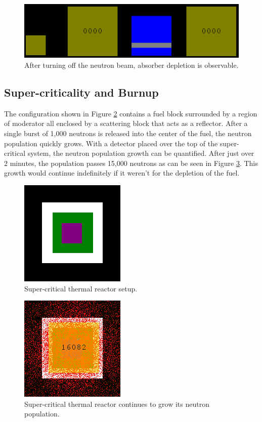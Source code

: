 \documentclass{anstrans}
\begin{document}
\begin{figure}
    \centering
    \includegraphics[width=\columnwidth]{atten-off.png}
    \caption{After turning off the neutron beam, absorber depletion is observable.}
    \label{fig:atten-off}
\end{figure}

\subsection{Super-criticality and Burnup}

The configuration shown in Figure \ref{fig:thermal-setup} contains a fuel
block surrounded by a region of moderator all enclosed by a scattering block
that acts as a reflector.  After a single burst of 1,000 neutrons is released
into the center of the fuel, the neutron population quickly grows.  With a
detector placed over the top of the super-critical system, the neutron
population growth can be quantified. After just over 2 minutes, the population
passes 15,000 neutrons as can be seen in Figure \ref{fig:thermal-on}.  This
growth would continue indefinitely if it weren't for the depletion of the
fuel.

\begin{figure}
    \centering
    \includegraphics{reactor-thermal-setup.png}
    \caption{Super-critical thermal reactor setup.}
    \label{fig:thermal-setup}
\end{figure}

\begin{figure}
    \centering
    \includegraphics{reactor-thermal-1min.png}
    \caption{Super-critical thermal reactor continues to grow its neutron population. }
    \label{fig:thermal-on}
\end{figure}
\end{document}
